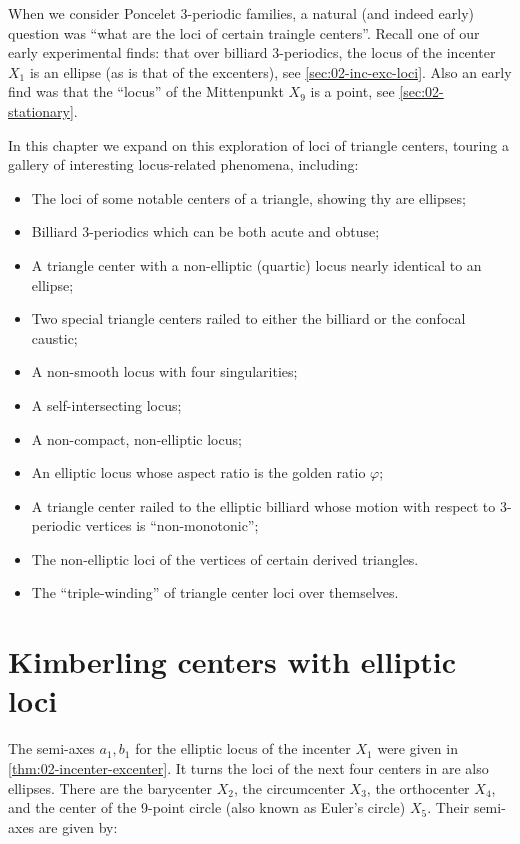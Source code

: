 When we consider Poncelet 3-periodic families, a natural (and indeed early) question was ``what are the loci of certain traingle centers''. Recall one of our early experimental finds: that over billiard 3-periodics, the locus of the incenter $X_1$ is an ellipse (as is that of the excenters), see \cref{sec:02-inc-exc-loci}. Also an early find was that the ``locus'' of the Mittenpunkt $X_9$ is a point, see \cref{sec:02-stationary}.

In this chapter we expand on this exploration of loci of triangle centers, touring a gallery of interesting locus-related phenomena, including:

\begin{itemize}
    \item The loci of some notable centers of a triangle, showing thy are ellipses;
    \item Billiard 3-periodics which can be both acute and obtuse;
    \item A triangle center with a non-elliptic (quartic) locus nearly identical to an ellipse;
    \item Two special triangle centers railed to either the billiard or the confocal caustic;
    \item A non-smooth locus with four singularities;
    \item A self-intersecting locus;
    \item A non-compact, non-elliptic locus;
    \item An elliptic locus whose aspect ratio is the golden ratio $\varphi$;
    \item A triangle center railed to the elliptic billiard whose motion with respect to 3-periodic vertices is ``non-monotonic'';
    \item The non-elliptic loci of the vertices of certain derived triangles. 
    \item The ``triple-winding'' of triangle center loci over themselves.
\end{itemize}

\section{Kimberling centers with elliptic loci}

The semi-axes $a_1,b_1$ for the elliptic locus of the incenter $X_1$ were given in \cref{thm:02-incenter-excenter}. It turns the loci of the next four centers in \cite{etc} are also ellipses. There are the barycenter $X_2$, the circumcenter $X_3$, the orthocenter $X_4$, and the center of the 9-point circle (also known as Euler's circle) $X_5$. Their semi-axes are given by:

